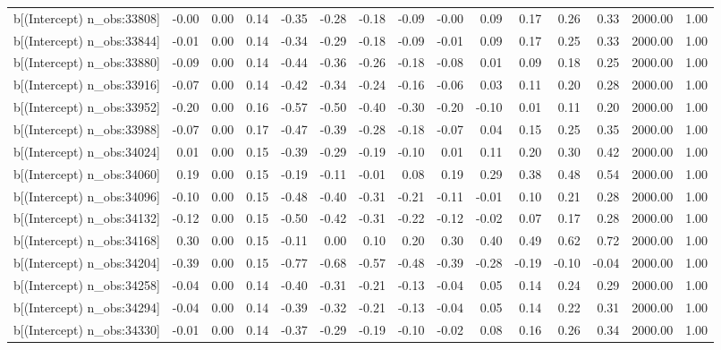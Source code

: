 \begin{table}[ht]
\begin{tabular}{rrrrrrrrrrrrrrr}
  b[(Intercept) n\_obs:33808] & -0.00 & 0.00 & 0.14 & -0.35 & -0.28 & -0.18 & -0.09 & -0.00 & 0.09 & 0.17 & 0.26 & 0.33 & 2000.00 & 1.00 \\ 
  b[(Intercept) n\_obs:33844] & -0.01 & 0.00 & 0.14 & -0.34 & -0.29 & -0.18 & -0.09 & -0.01 & 0.09 & 0.17 & 0.25 & 0.33 & 2000.00 & 1.00 \\ 
  b[(Intercept) n\_obs:33880] & -0.09 & 0.00 & 0.14 & -0.44 & -0.36 & -0.26 & -0.18 & -0.08 & 0.01 & 0.09 & 0.18 & 0.25 & 2000.00 & 1.00 \\ 
  b[(Intercept) n\_obs:33916] & -0.07 & 0.00 & 0.14 & -0.42 & -0.34 & -0.24 & -0.16 & -0.06 & 0.03 & 0.11 & 0.20 & 0.28 & 2000.00 & 1.00 \\ 
  b[(Intercept) n\_obs:33952] & -0.20 & 0.00 & 0.16 & -0.57 & -0.50 & -0.40 & -0.30 & -0.20 & -0.10 & 0.01 & 0.11 & 0.20 & 2000.00 & 1.00 \\ 
  b[(Intercept) n\_obs:33988] & -0.07 & 0.00 & 0.17 & -0.47 & -0.39 & -0.28 & -0.18 & -0.07 & 0.04 & 0.15 & 0.25 & 0.35 & 2000.00 & 1.00 \\ 
  b[(Intercept) n\_obs:34024] & 0.01 & 0.00 & 0.15 & -0.39 & -0.29 & -0.19 & -0.10 & 0.01 & 0.11 & 0.20 & 0.30 & 0.42 & 2000.00 & 1.00 \\ 
  b[(Intercept) n\_obs:34060] & 0.19 & 0.00 & 0.15 & -0.19 & -0.11 & -0.01 & 0.08 & 0.19 & 0.29 & 0.38 & 0.48 & 0.54 & 2000.00 & 1.00 \\ 
  b[(Intercept) n\_obs:34096] & -0.10 & 0.00 & 0.15 & -0.48 & -0.40 & -0.31 & -0.21 & -0.11 & -0.01 & 0.10 & 0.21 & 0.28 & 2000.00 & 1.00 \\ 
  b[(Intercept) n\_obs:34132] & -0.12 & 0.00 & 0.15 & -0.50 & -0.42 & -0.31 & -0.22 & -0.12 & -0.02 & 0.07 & 0.17 & 0.28 & 2000.00 & 1.00 \\ 
  b[(Intercept) n\_obs:34168] & 0.30 & 0.00 & 0.15 & -0.11 & 0.00 & 0.10 & 0.20 & 0.30 & 0.40 & 0.49 & 0.62 & 0.72 & 2000.00 & 1.00 \\ 
  b[(Intercept) n\_obs:34204] & -0.39 & 0.00 & 0.15 & -0.77 & -0.68 & -0.57 & -0.48 & -0.39 & -0.28 & -0.19 & -0.10 & -0.04 & 2000.00 & 1.00 \\ 
  b[(Intercept) n\_obs:34258] & -0.04 & 0.00 & 0.14 & -0.40 & -0.31 & -0.21 & -0.13 & -0.04 & 0.05 & 0.14 & 0.24 & 0.29 & 2000.00 & 1.00 \\ 
  b[(Intercept) n\_obs:34294] & -0.04 & 0.00 & 0.14 & -0.39 & -0.32 & -0.21 & -0.13 & -0.04 & 0.05 & 0.14 & 0.22 & 0.31 & 2000.00 & 1.00 \\ 
  b[(Intercept) n\_obs:34330] & -0.01 & 0.00 & 0.14 & -0.37 & -0.29 & -0.19 & -0.10 & -0.02 & 0.08 & 0.16 & 0.26 & 0.34 & 2000.00 & 1.00 \\ 

\end{tabular}
\end{table}
